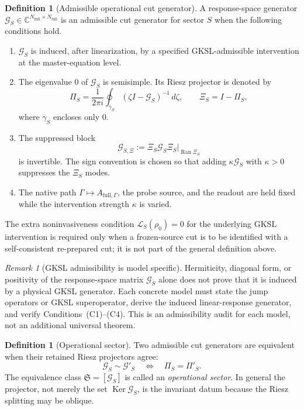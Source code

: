 \documentclass[11pt]{article}
\theoremstyle{definition}
\newtheorem{definition}[theorem]{Definition}
\theoremstyle{remark}
\newtheorem{remark}[theorem]{Remark}
\theoremstyle{plain}
\newcommand{\C}{\mathbb C}
\newcommand{\Ran}{\operatorname{Ran}}
\newcommand{\Ker}{\operatorname{Ker}}
\newcommand{\full}{\mathrm{full}}
\newcommand{\Gcut}{\mathcal G}
\begin{document}
\begin{definition}[Admissible operational cut generator]\label{def:admissible-cut}
A response-space generator $\Gcut_S\in\C^{N_{\full}\times N_{\full}}$ is an admissible cut generator for sector $S$ when the following conditions hold.
\begin{enumerate}[label=(C\arabic*)]
  \item $\Gcut_S$ is induced, after linearization, by a specified GKSL-admissible intervention at the master-equation level.
  \item The eigenvalue $0$ of $\Gcut_S$ is semisimple.  Its Riesz projector is denoted by
  \[
    \Pi_S=\frac{1}{2\pi i}\oint_{\gamma_S}(\zeta I-\Gcut_S)^{-1}\,d\zeta,
    \qquad \Xi_S=I-\Pi_S,
  \]
  where $\gamma_S$ encloses only $0$.
  \item The suppressed block
  \[
    \Gcut_{S,\Xi}:=\Xi_S\Gcut_S\Xi_S\big|_{\Ran\Xi_S}
  \]
  is invertible.  The sign convention is chosen so that adding $\kappa\Gcut_S$ with $\kappa>0$ suppresses the $\Xi_S$ modes.
  \item The native path $\Gamma\mapsto A_{\full,\Gamma}$, the probe source, and the readout are held fixed while the intervention strength $\kappa$ is varied.
\end{enumerate}
The extra noninvasiveness condition $\mathcal L_S(\rho_0)=0$ for the underlying GKSL intervention is required only when a frozen-source cut is to be identified with a self-consistent re-prepared cut; it is not part of the general definition above.
\end{definition}

\begin{remark}[GKSL admissibility is model specific]\label{rem:gksl-model}
Hermiticity, diagonal form, or positivity of the response-space matrix $\Gcut_S$ alone does not prove that it is induced by a physical GKSL generator.  Each concrete model must state the jump operators or GKSL superoperator, derive the induced linear-response generator, and verify Conditions~(C1)--(C4).  This is an admissibility audit for each model, not an additional universal theorem.
\end{remark}

\begin{definition}[Operational sector]\label{def:operational-sector}
Two admissible cut generators are equivalent when their retained Riesz projectors agree:
\begin{equation}
  \Gcut_S\sim\Gcut'_S
  \quad\Longleftrightarrow\quad
  \Pi_S=\Pi'_S.
\end{equation}
The equivalence class $\mathfrak S=[\Gcut_S]$ is called an \emph{operational sector}.  In general the projector, not merely the set $\Ker\Gcut_S$, is the invariant datum because the Riesz splitting may be oblique.
\end{definition}
\end{document}
